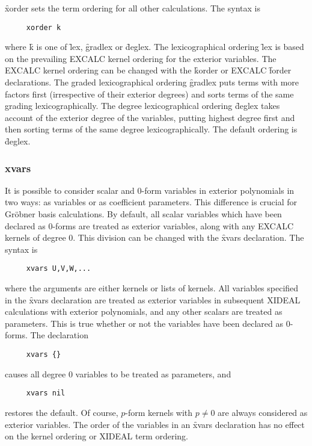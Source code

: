 \f{xorder} sets the term ordering for all other calculations. The syntax is
\begin{verbatim}
     xorder k
\end{verbatim}
where \f{k} is one of \f{lex}, \f{gradlex} or \f{deglex}. The
lexicographical ordering \f{lex} is based on the prevailing EXCALC kernel
ordering for the exterior variables. The EXCALC kernel ordering can be
changed with the \REDUCE{} \f{korder} or EXCALC \f{forder} declarations. The
graded lexicographical ordering \f{gradlex} puts terms with more factors
first (irrespective of their exterior degrees) and sorts terms of the same
grading lexicographically. The degree lexicographical ordering \f{deglex}
takes account of the exterior degree of the variables, putting highest
degree first and then sorting terms of the same degree lexicographically.
The default ordering is \f{deglex}.


\subsubsection*{xvars}

It is possible to consider scalar and 0-form variables in exterior
polynomials in two ways: as variables or as coefficient parameters. This
difference is crucial for Gr{\"o}bner basis calculations. By default, all
scalar variables which have been declared as 0-forms are treated as
exterior variables, along with any EXCALC kernels of degree 0. This
division can be changed with the \f{xvars} declaration. The syntax is
\begin{verbatim}
     xvars U,V,W,...
\end{verbatim}
where the arguments are either kernels or lists of kernels. All variables
specified in the \f{xvars} declaration are treated as exterior variables in
subsequent XIDEAL calculations with exterior polynomials, and any other
scalars are treated as parameters. This is true whether or not the
variables have been declared as 0-forms. The declaration
\begin{verbatim}
     xvars {}
\end{verbatim}
causes all degree 0 variables to be treated as parameters, and
\begin{verbatim}
     xvars nil
\end{verbatim}
restores the default. Of course, $p$-form kernels with $p\not=0$ are always
considered as exterior variables. The order of the variables in an
\f{xvars} declaration has no effect on the \REDUCE{} kernel ordering or
XIDEAL term ordering.




